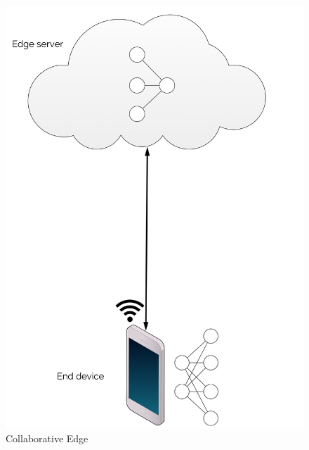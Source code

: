 \hfill
\begin{minipage}{0.3\linewidth}
	\centering
	\begin{figure}
		\centering
		\includegraphics[width=\linewidth]{figures/models/edge_device}
		\caption[Collaborative Edge]{Collaborative Edge}
	\end{figure}
\end{minipage}

